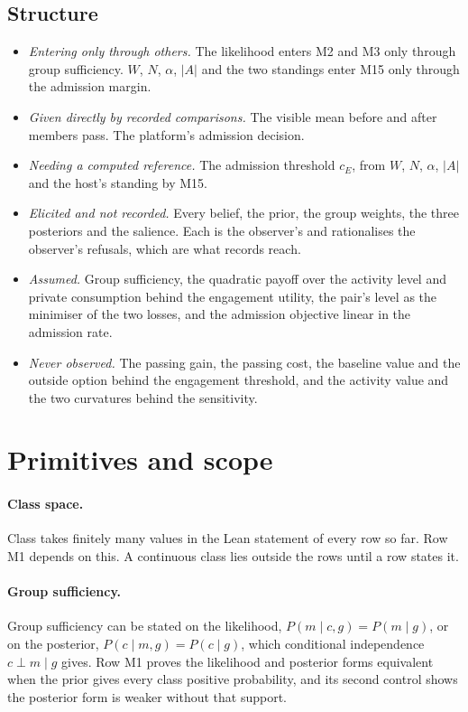 \subsection{Structure}

\begin{itemize}
\item \emph{Entering only through others.} The likelihood enters M2 and M3
  only through group sufficiency. $W$, $N$, $\alpha$, $|A|$ and the two
  standings enter M15 only through the admission margin.
\item \emph{Given directly by recorded comparisons.} The visible mean before
  and after members pass. The platform's admission decision.
\item \emph{Needing a computed reference.} The admission threshold $c_E$,
  from $W$, $N$, $\alpha$, $|A|$ and the host's standing by M15.
\item \emph{Elicited and not recorded.} Every belief, the prior, the group
  weights, the three posteriors and the salience. Each is the observer's and
  rationalises the observer's refusals, which are what records reach.
\item \emph{Assumed.} Group sufficiency, the quadratic payoff over the
  activity level and private consumption behind the engagement utility, the
  pair's level as the minimiser of the two losses, and the admission
  objective linear in the admission rate.
\item \emph{Never observed.} The passing gain, the passing cost, the
  baseline value and the outside option behind the engagement threshold,
  and the activity value and the two curvatures behind the sensitivity.
\end{itemize}

\section{Primitives and scope}
\label{app:scope}

\paragraph{Class space.} Class takes finitely many values in the Lean
statement of every row so far. Row M1 depends on this. A continuous class
lies outside the rows until a row states it.

\paragraph{Group sufficiency.} Group sufficiency can be stated on the
likelihood, $P(m\mid c,g)=P(m\mid g)$, or on the posterior,
$P(c\mid m,g)=P(c\mid g)$, which conditional independence $c\perp m\mid g$
gives.
Row M1 proves the likelihood and posterior forms equivalent when the prior
gives every class positive probability, and its second control shows the
posterior form is weaker without that support.

